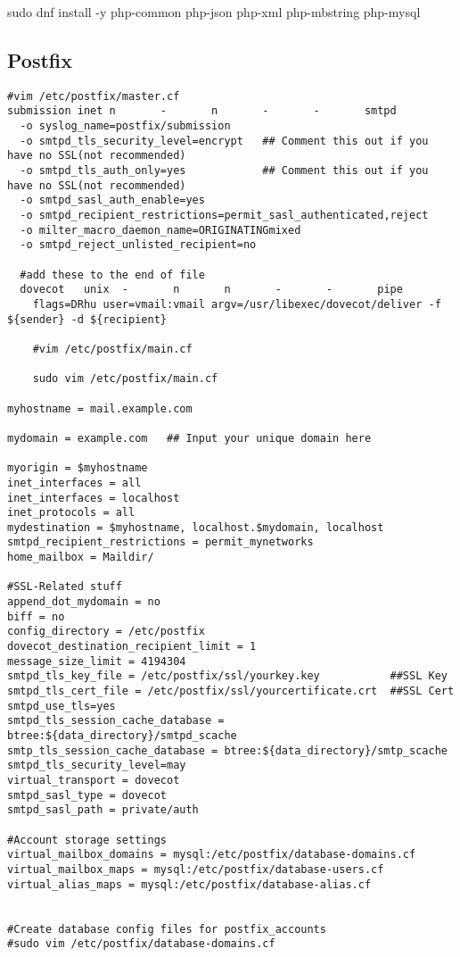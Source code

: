 \documentclass{article}
\begin{document}
sudo dnf install -y php-common php-json php-xml php-mbstring php-mysql
\subsection{Postfix}

\begin{verbatim}
#vim /etc/postfix/master.cf 
submission inet n       -       n       -       -       smtpd
  -o syslog_name=postfix/submission
  -o smtpd_tls_security_level=encrypt   ## Comment this out if you have no SSL(not recommended)
  -o smtpd_tls_auth_only=yes            ## Comment this out if you have no SSL(not recommended)
  -o smtpd_sasl_auth_enable=yes
  -o smtpd_recipient_restrictions=permit_sasl_authenticated,reject
  -o milter_macro_daemon_name=ORIGINATINGmixed
  -o smtpd_reject_unlisted_recipient=no
  
  #add these to the end of file
  dovecot   unix  -       n       n       -       -       pipe
    flags=DRhu user=vmail:vmail argv=/usr/libexec/dovecot/deliver -f ${sender} -d ${recipient}
    
    #vim /etc/postfix/main.cf
    
    sudo vim /etc/postfix/main.cf

myhostname = mail.example.com

mydomain = example.com   ## Input your unique domain here

myorigin = $myhostname
inet_interfaces = all
inet_interfaces = localhost
inet_protocols = all
mydestination = $myhostname, localhost.$mydomain, localhost
smtpd_recipient_restrictions = permit_mynetworks
home_mailbox = Maildir/

#SSL-Related stuff
append_dot_mydomain = no
biff = no
config_directory = /etc/postfix
dovecot_destination_recipient_limit = 1
message_size_limit = 4194304
smtpd_tls_key_file = /etc/postfix/ssl/yourkey.key           ##SSL Key
smtpd_tls_cert_file = /etc/postfix/ssl/yourcertificate.crt  ##SSL Cert
smtpd_use_tls=yes
smtpd_tls_session_cache_database = btree:${data_directory}/smtpd_scache
smtp_tls_session_cache_database = btree:${data_directory}/smtp_scache
smtpd_tls_security_level=may
virtual_transport = dovecot
smtpd_sasl_type = dovecot
smtpd_sasl_path = private/auth

#Account storage settings
virtual_mailbox_domains = mysql:/etc/postfix/database-domains.cf
virtual_mailbox_maps = mysql:/etc/postfix/database-users.cf
virtual_alias_maps = mysql:/etc/postfix/database-alias.cf


#Create database config files for postfix_accounts
#sudo vim /etc/postfix/database-domains.cf


\end{verbatim}
\end{document}
